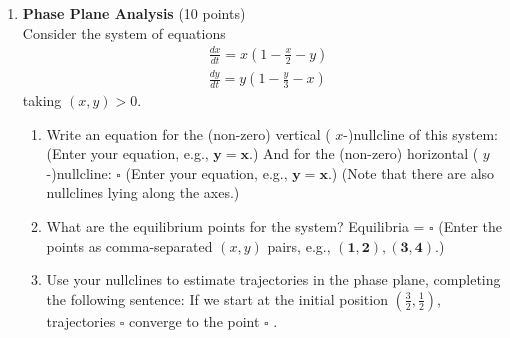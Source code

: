 \begin{enumerate}
  \item \textbf{Phase Plane Analysis} (10 points)\\
  Consider the system of equations
  $$
  \begin{aligned}
  & \frac{d x}{d t}=x\left(1-\frac{x}{2}-y\right) \\
  & \frac{d y}{d t}=y\left(1-\frac{y}{3}-x\right)
  \end{aligned}
  $$
  taking $(x, y)>0$.
  \begin{enumerate}[label=(\alph*)]
    \item Write an equation for the (non-zero) vertical ( $x$-)nullcline of this system:
    (Enter your equation, e.g., $\boldsymbol{y}=\boldsymbol{x}$.)
    And for the (non-zero) horizontal ( $y$-)nullcline:
    $\square$
    (Enter your equation, e.g., $\boldsymbol{y}=\boldsymbol{x}$.)
    (Note that there are also nullclines lying along the axes.)
    \begin{subanswer}
    \end{subanswer}
    \item What are the equilibrium points for the system?
    Equilibria = $\square$
    (Enter the points as comma-separated $(x, y)$ pairs, e.g., $(\mathbf{1 , 2}),(\mathbf{3 , 4})$.)
    \begin{subanswer}
    \end{subanswer}
    \item Use your nullclines to estimate trajectories in the phase plane, completing the following sentence:
    If we start at the initial position $\left(\frac{3}{2}, \frac{1}{2}\right)$, trajectories $\square$ converge to the point $\square$ .
    \begin{subanswer}
    \end{subanswer}
  \end{enumerate}


\end{enumerate}
